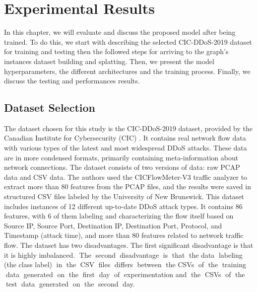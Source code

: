 \chapter{Experimental Results}
\label{chapter:discussion}

In this chapter, we will evaluate and discuss the proposed model after being trained. To do this, we start with describing the selected CIC-DDoS-2019 dataset for training and testing then the followed steps for arriving to the graph's instances dataset building and splatting. Then, we present the model hyperparameters, the different architectures and the training process. Finally, we discuss the testing and performances results.

\section{Dataset Selection} 
The dataset chosen for this study is the CIC-DDoS-2019 dataset, provided by the Canadian Institute for Cybersecurity (CIC) \cite{cic}. It contains real network flow data with various types of the latest and most widespread DDoS attacks. These data are in more condensed formats, primarily containing meta-information about network connections. The dataset consists of two versions of data: raw PCAP data and CSV data. The authors used the CICFlowMeter-V3 traffic analyzer to extract more than 80 features from the PCAP files, and the results were saved in structured CSV files labeled by the University of New Brunswick.
This dataset includes instances of 12 different up-to-date DDoS attack types. It contains 86 features, with 6 of them labeling and characterizing the flow itself based on Source IP, Source Port, Destination IP, Destination Port, Protocol, and Timestamp (attack time), and more than 80 features related to network traffic flow.
The dataset has two disadvantages. The first significant disadvantage is that it is highly imbalanced. \textcolor{white}{.}The \textcolor{white}{.}second \textcolor{white}{.}disadvantage \textcolor{white}{.}is \textcolor{white}{.}that \textcolor{white}{.}the data \textcolor{white}{.}labeling \textcolor{white}{.}(the class label)\textcolor{white}{.} in\textcolor{white}{.} the\textcolor{white}{.} CSV\textcolor{white}{.} files\textcolor{white}{.} differs \textcolor{white}{.}between \textcolor{white}{.}the CSVs \textcolor{white}{.}of \textcolor{white}{.}the \textcolor{white}{.}training \textcolor{white}{.}data \textcolor{white}{.}generated \textcolor{white}{.}on \textcolor{white}{.}the \textcolor{white}{.}first \textcolor{white}{.}day \textcolor{white}{.}of \textcolor{white}{.}experimentation and \textcolor{white}{.}the \textcolor{white}{.}CSVs\textcolor{white}{.} of \textcolor{white}{.}the \textcolor{white}{.}test\textcolor{white}{.} data \textcolor{white}{.}generated\textcolor{white}{.} on\textcolor{white}{.} the\textcolor{white}{.} second\textcolor{white}{.} day. 
